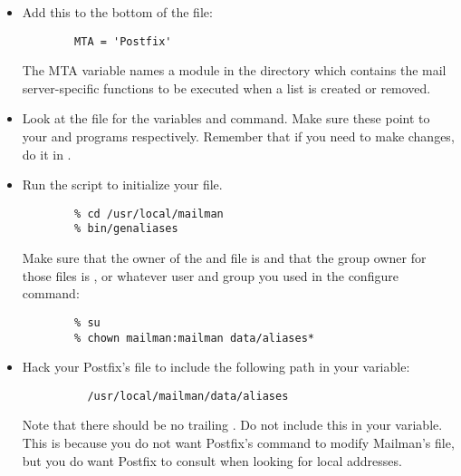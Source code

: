 \documentclass{howto}
\begin{document}
\begin{itemize}
\item Add this to the bottom of the 
      file:

      \begin{verbatim}
        MTA = 'Postfix'
      \end{verbatim}

      The MTA variable names a module in the  directory
      which contains the mail server-specific functions to be executed when a
      list is created or removed.

\item Look at the  file for the variables
       and  command.  Make sure
      these point to your  and  programs
      respectively.  Remember that if you need to make changes, do it in
      .

\item Run the  script to initialize your
       file.

      \begin{verbatim}
        % cd /usr/local/mailman
        % bin/genaliases
      \end{verbatim}

      Make sure that the owner of the  and
       file is  and that the group owner
      for those files is , or whatever user and group you used
      in the configure command:

      \begin{verbatim}
        % su
        % chown mailman:mailman data/aliases*
      \end{verbatim}

\item Hack your Postfix's  file to include the following path in
      your  variable:

      \begin{verbatim}
          /usr/local/mailman/data/aliases
      \end{verbatim}

      Note that there should be no trailing .  Do not include this
      in your  variable.  This is because you do not want
      Postfix's  command to modify Mailman's
       file, but you do want Postfix to consult
       when looking for local addresses.


\end{itemize}
\end{document}

